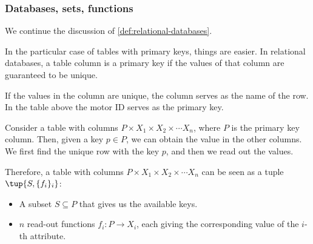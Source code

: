 \label{sec:specialization}

\subsubsection{Databases, sets, functions}

We continue the discussion of \cref{def:relational-databases}.

In the particular case of tables with primary keys,
things are easier. In relational databases, 
a table column is a primary key if the values of that column are guaranteed to be unique.

If the values in the column are unique, the column serves as the name of the row. In the table 
above the motor ID serves as the primary key.

Consider a table with columns $P \times X_1 \times X_2 \times \cdots X_n$,
where $P$ is the primary key column. Then, given a key $p \in P$,
we can obtain the value in the other columns. We first find the unique
row with the key $p$, and then we read out the values. 

Therefore, a table with columns $P \times X_1 \times X_2 \times \cdots X_n$
can be seen as a tuple $\tup{S, \{f_i\}_i}$:
\begin{itemize}
    \item A subset $S \subseteq P$ that gives us the available keys.
    \item $n$ read-out functions $f_i: P \to X_i$, each giving the 
    corresponding value of the $i$-th attribute.
\end{itemize}




\begin{comment}
\begin{table}[h]
    \centering
    \begin{tabular}{c|c|c|c|c|c}
         Motor ID & Company& Size & \unit[Weight]{[g]} & \unit[Max Power]{[W]} & \unit[price]{[USD]} \\
         \hline
         $\textsf{Model1}$&Company $\textsf{B}$ & 2 x 3 x 4& 10 & &259\\
         $\textsf{Model2}$&Company $\textsf{A}$ &2 x 3 x 4& 20 & &109\\
         $\textsf{Model3}$&Company $\textsf{B}$ &2 x 3 x 4& 5 & &124\\
         $\textsf{Model4}$&Company $\textsf{C}$ &2 x 3 x 4& 30 & &399\\
         $\textsf{Model5}$&Company $\textsf{A}$ &2 x 3 x 4& 45 & &245  \\
        $\textsf{Model6}$&Company $\textsf{D}$ & 2 x 3 x 4& 20 & &89\\
        $\textsf{Model7}$&Company $\textsf{B}$ & 2 x 3 x 4& 15 &&130
    \end{tabular}
    \caption{A simplified catalogue of motors.}
    \label{tab:electric_motors}
\end{table}
\end{comment}


